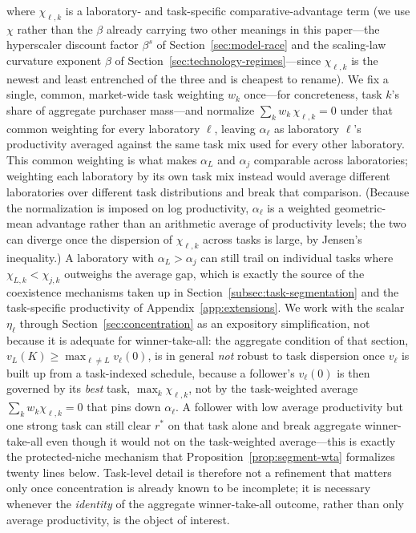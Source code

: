 \documentclass[11pt]{article}
\begin{document}
where $\chi_{\ell,k}$ is a laboratory- and task-specific comparative-advantage term (we use $\chi$ rather than the $\beta$ already carrying two other meanings in this paper---the hyperscaler discount factor $\beta^s$ of Section~\ref{sec:model-race} and the scaling-law curvature exponent $\beta$ of Section~\ref{sec:technology-regimes}---since $\chi_{\ell,k}$ is the newest and least entrenched of the three and is cheapest to rename). We fix a single, common, market-wide task weighting $w_k$ once---for concreteness, task $k$'s share of aggregate purchaser mass---and normalize $\sum_k w_k\,\chi_{\ell,k}=0$ under that common weighting for every laboratory $\ell$, leaving $\alpha_\ell$ as laboratory $\ell$'s productivity averaged against the same task mix used for every other laboratory. This common weighting is what makes $\alpha_L$ and $\alpha_j$ comparable across laboratories; weighting each laboratory by its own task mix instead would average different laboratories over different task distributions and break that comparison. (Because the normalization is imposed on log productivity, $\alpha_\ell$ is a weighted geometric-mean advantage rather than an arithmetic average of productivity levels; the two can diverge once the dispersion of $\chi_{\ell,k}$ across tasks is large, by Jensen's inequality.) A laboratory with $\alpha_L>\alpha_j$ can still trail on individual tasks where $\chi_{L,k}<\chi_{j,k}$ outweighs the average gap, which is exactly the source of the coexistence mechanisms taken up in Section~\ref{subsec:task-segmentation} and the task-specific productivity of Appendix~\ref{app:extensions}. We work with the scalar $\eta_\ell$ through Section~\ref{sec:concentration} as an expository simplification, not because it is adequate for winner-take-all: the aggregate condition of that section, $v_L(K)\geq\max_{\ell\neq L}v_\ell(0)$, is in general \emph{not} robust to task dispersion once $v_\ell$ is built up from a task-indexed schedule, because a follower's $v_\ell(0)$ is then governed by its \emph{best} task, $\max_k\chi_{\ell,k}$, not by the task-weighted average $\sum_k w_k\chi_{\ell,k}=0$ that pins down $\alpha_\ell$. A follower with low average productivity but one strong task can still clear $r^*$ on that task alone and break aggregate winner-take-all even though it would not on the task-weighted average---this is exactly the protected-niche mechanism that Proposition~\ref{prop:segment-wta} formalizes twenty lines below. Task-level detail is therefore not a refinement that matters only once concentration is already known to be incomplete; it is necessary whenever the \emph{identity} of the aggregate winner-take-all outcome, rather than only average productivity, is the object of interest.
\end{document}
